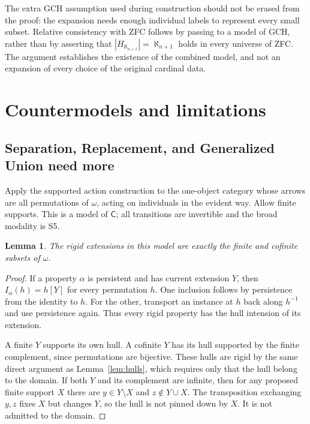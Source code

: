\documentclass[11pt]{article}
\newtheorem{lemma}[theorem]{Lemma}
\theoremstyle{definition}
\newcommand{\C}{\mathsf C}
\numberwithin{equation}{section}
\begin{document}
The extra GCH assumption used during construction should not be erased from the proof: the expansion needs enough individual labels to represent every small subset. Relative consistency with ZFC follows by passing to a model of GCH, rather than by asserting that $|H_{\aleph_{n+1}}|=\aleph_{n+1}$ holds in every universe of ZFC. The argument establishes the existence of the combined model, and not an expansion of every choice of the original cardinal data.


\section{Countermodels and limitations}\label{app:counter}

\subsection{Separation, Replacement, and Generalized Union need more}

Apply the supported action construction to the one-object category whose arrows are all permutations of $\omega$, acting on individuals in the evident way. Allow finite supports. This is a model of $\C$; all transitions are invertible and the broad modality is S5.

\begin{lemma}
The rigid extensions in this model are exactly the finite and cofinite subsets of $\omega$.
\end{lemma}
\begin{proof}
If a property $\alpha$ is persistent and has current extension $Y$, then $I_\alpha(h)=h[Y]$ for every permutation $h$. One inclusion follows by persistence from the identity to $h$. For the other, transport an instance at $h$ back along $h^{-1}$ and use persistence again. Thus every rigid property has the hull intension of its extension.

A finite $Y$ supports its own hull. A cofinite $Y$ has its hull supported by the finite complement, since permutations are bijective. These hulls are rigid by the same direct argument as Lemma~\ref{lem:hulls}, which requires only that the hull belong to the domain. If both $Y$ and its complement are infinite, then for any proposed finite support $X$ there are $y\in Y\setminus X$ and $z\notin Y\cup X$. The transposition exchanging $y,z$ fixes $X$ but changes $Y$, so the hull is not pinned down by $X$. It is not admitted to the domain.
\end{proof}
\end{document}
